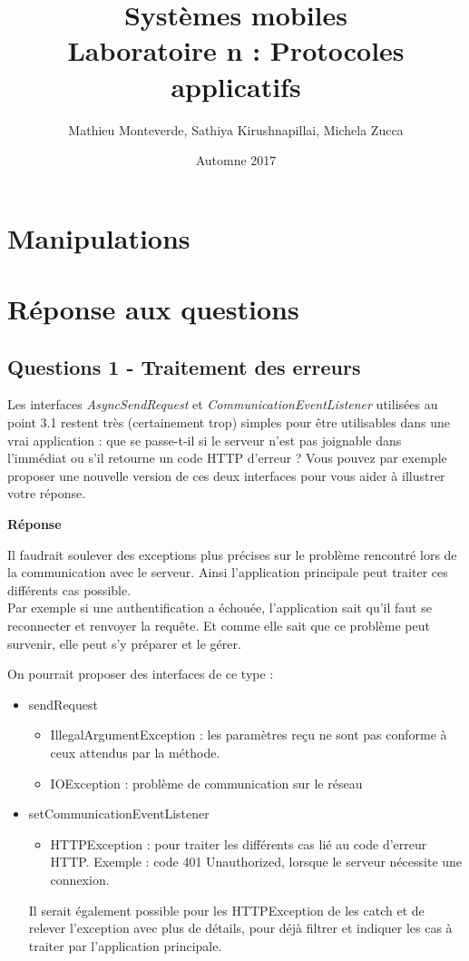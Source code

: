 \documentclass[francais,12pt]{article}
\title{Systèmes mobiles \\ Laboratoire n\textordmasculine2 : Protocoles applicatifs}
\author{Mathieu Monteverde, Sathiya Kirushnapillai, Michela Zucca}
\date{Automne 2017}
\begin{document}
	
	\maketitle
	
	\setlength{\parskip}{1em}
	
	\section*{Manipulations}
	
	\section*{Réponse aux questions}
	
	\subsection*{Questions 1 - Traitement des erreurs}
	
	Les interfaces \textit{AsyncSendRequest} et \textit{CommunicationEventListener} utilisées au point 3.1 restent très (certainement trop) simples pour être utilisables dans une vrai application : que se passe-t-il si le serveur n'est pas joignable dans l'immédiat ou s'il retourne un code HTTP d'erreur ? Vous pouvez par exemple proposer une nouvelle version de ces deux interfaces pour vous aider à illustrer votre réponse.
	
	{\color[rgb]{0,0.5,0.23}\textbf{Réponse}}
	
	Il faudrait soulever des exceptions plus précises sur le problème rencontré lors de la communication avec le serveur. Ainsi l'application principale peut traiter ces différents cas possible. \\
	Par exemple si une authentification a échouée, l'application sait qu'il faut se reconnecter et renvoyer la requête. Et comme elle sait que ce problème peut survenir, elle peut s'y préparer et le gérer. 
	
	On pourrait proposer des interfaces de ce type : 
	\begin{itemize}
		\item sendRequest
		\begin{itemize}
			\item IllegalArgumentException : les paramètres reçu ne sont pas conforme à ceux attendus par la méthode.
			\item IOException : problème de communication sur le réseau
		\end{itemize}
		\item setCommunicationEventListener
		\begin{itemize}
			\item HTTPException : pour traiter les différents cas lié au code d'erreur HTTP. Exemple : code 401 Unauthorized, lorsque le serveur nécessite une connexion.
		\end{itemize}
	
	Il serait également possible pour les HTTPException de les catch et de relever l'exception avec plus de détails, pour déjà filtrer et indiquer les cas à traiter par l'application principale.
		
	\end{itemize}
	
\end{document}
